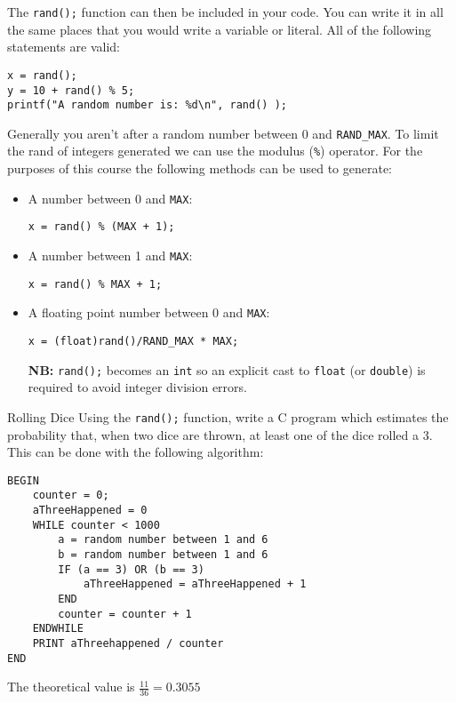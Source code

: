 \documentclass{lab}
\begin{document}
The \texttt{rand();} function can then be included in your code. You can write it in all the same places that you would write a variable or literal. All of the following statements are valid:

\begin{lstlisting}[style=CStyle]
x = rand();
y = 10 + rand() % 5;
printf("A random number is: %d\n", rand() );
\end{lstlisting}

Generally you aren't after a random number between 0 and \texttt{RAND\_MAX}. To limit the rand of integers generated we can use the modulus (\texttt{\%}) operator. For the purposes of this course the following methods can be used to generate:

\begin{itemize}
\item A number between 0 and \texttt{MAX}:
\begin{lstlisting}[style=CStyle]
x = rand() % (MAX + 1);
\end{lstlisting}

\item A number between 1 and \texttt{MAX}:
\begin{lstlisting}[style=CStyle]
x = rand() % MAX + 1;
\end{lstlisting}

\item A floating point number between 0 and \texttt{MAX}:
\begin{lstlisting}[style=CStyle]
x = (float)rand()/RAND_MAX * MAX;
\end{lstlisting}
\textbf{NB:} \texttt{rand();} becomes an \texttt{int} so an explicit cast to \texttt{float} (or \texttt{double}) is required to avoid integer division errors.

\end{itemize}

\begin{task}{Rolling Dice}{}
Using the \texttt{rand();} function, write a C program which estimates the probability that, when two dice are thrown, at least one of the dice rolled a 3. This can be done with the following algorithm:
\begin{lstlisting}[style=pseudo]
BEGIN
	counter = 0;
	aThreeHappened = 0
	WHILE counter < 1000
		a = random number between 1 and 6
		b = random number between 1 and 6
		IF (a == 3) OR (b == 3)
			aThreeHappened = aThreeHappened + 1
		END
		counter = counter + 1
	ENDWHILE
	PRINT aThreehappened / counter
END
\end{lstlisting}

The theoretical value is $\frac{11}{36} = 0.3055$
\end{task}
\end{document}
